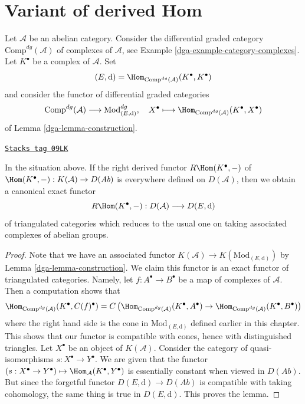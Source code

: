 \section{Variant of derived Hom}
\label{dga-section-variant}
Let $\mathcal{A}$ be an abelian category. Consider the differential graded
category $\text{Comp}^{dg}(\mathcal{A})$ of complexes of $\mathcal{A}$, see
Example \ref{dga-example-category-complexes}.
Let $K^\bullet$ be a complex of $\mathcal{A}$. Set
$$
(E, \text{d}) = \Hom_{\text{Comp}^{dg}(\mathcal{A})}(K^\bullet, K^\bullet)
$$
and consider the functor of differential graded categories
$$
\text{Comp}^{dg}(\mathcal{A}) \longrightarrow \text{Mod}^{dg}_{(E, \text{d})},
\quad
X^\bullet
\longmapsto
\Hom_{\text{Comp}^{dg}(\mathcal{A})}(K^\bullet, X^\bullet)
$$
of Lemma \ref{dga-lemma-construction}.

\begin{lemma}
\label{dga-lemma-existence-of-derived}
\href{https://stacks.math.columbia.edu/tag/09LK}{\texttt{Stacks tag 09LK}}

In the situation above. If the right derived functor $R\Hom(K^\bullet, -)$
of $\Hom(K^\bullet, -) : K(\mathcal{A}) \to D(\textit{Ab})$
is everywhere defined on $D(\mathcal{A})$, then we obtain a canonical exact
functor
$$
R\Hom(K^\bullet, -) : D(\mathcal{A}) \longrightarrow D(E, \text{d})
$$
of triangulated categories which reduces to the usual one  on taking
associated complexes of abelian groups.
\end{lemma}

\begin{proof}

Note that we have an associated functor
$K(\mathcal{A}) \to K(\text{Mod}_{(E, \text{d})})$ by
Lemma \ref{dga-lemma-construction}.
We claim this functor is an exact functor of triangulated categories.
Namely, let $f : A^\bullet \to B^\bullet$ be a map of complexes
of $\mathcal{A}$. Then a computation shows that
$$
\Hom_{\text{Comp}^{dg}(\mathcal{A})}(K^\bullet, C(f)^\bullet)
=
C\left(
\Hom_{\text{Comp}^{dg}(\mathcal{A})}(K^\bullet, A^\bullet) \to
\Hom_{\text{Comp}^{dg}(\mathcal{A})}(K^\bullet, B^\bullet)
\right)
$$
where the right hand side is the cone in $\text{Mod}_{(E, \text{d})}$
defined earlier in this chapter.
This shows that our functor is compatible with cones, hence with
distinguished triangles. Let $X^\bullet$ be an object of $K(\mathcal{A})$.
Consider the category of quasi-isomorphisms $s : X^\bullet \to Y^\bullet$.
We are given that the functor
$(s : X^\bullet \to Y^\bullet) \mapsto \Hom_\mathcal{A}(K^\bullet, Y^\bullet)$
is essentially constant when viewed in $D(\textit{Ab})$.
But since the forgetful functor $D(E, \text{d}) \to D(\textit{Ab})$
is compatible with taking cohomology, the same thing is true in
$D(E, \text{d})$. This proves the lemma.
\end{proof}

